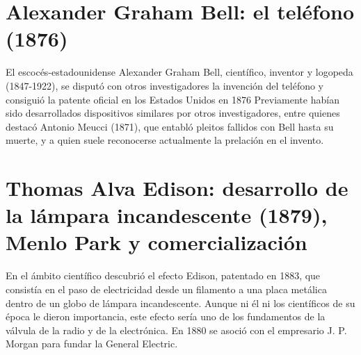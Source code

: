 \documentclass{article}
\begin{document}



\section{Alexander Graham Bell: el teléfono (1876)}

El escocés-estadounidense Alexander Graham Bell, científico, inventor y logopeda (1847-1922), se disputó con otros investigadores la invención del teléfono y consiguió la patente oficial en los Estados Unidos en 1876 Previamente habían sido desarrollados dispositivos similares por otros investigadores, entre quienes destacó Antonio Meucci (1871), que entabló pleitos fallidos con Bell hasta su muerte, y a quien suele reconocerse actualmente la prelación en el invento.\citep{HDE}\\


\section{Thomas Alva Edison: desarrollo de la lámpara incandescente (1879), Menlo Park y comercialización}

En el ámbito científico descubrió el efecto Edison, patentado en 1883, que consistía en el paso de electricidad desde un filamento a una placa metálica dentro de un globo de lámpara incandescente. Aunque ni él ni los científicos de su época le dieron importancia, este efecto sería uno de los fundamentos de la válvula de la radio y de la electrónica. En 1880 se asoció con el empresario J. P. Morgan para fundar la General Electric.\citep{HDE}\\
\end{document}
